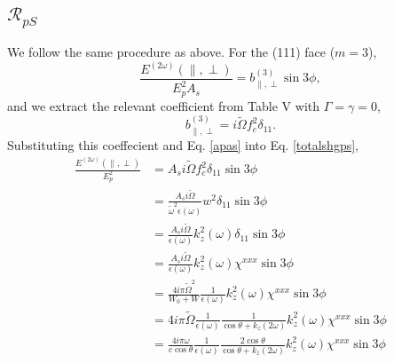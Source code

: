 \subsection{\texorpdfstring{$\mathcal{R}_{pS}$}{RpS}}
We follow the same procedure as above. For the (111) face ($m = 3$),
\begin{equation}\label{totalshgps}%
\frac{E^{(2\omega)}(\parallel,\perp)}{E^{2}_{p}A_{s}} 
= b^{(3)}_{\parallel,\perp}\sin3\phi,
\end{equation}
and we extract the relevant coefficient from Table V with $\Gamma=\gamma=0$,
\begin{equation*}
b^{(3)}_{\parallel,\perp} = i\tilde{\Omega}f^{2}_{c}\delta_{11}.
\end{equation*}
Substituting this coeffecient and Eq. \eqref{apas} into Eq. \eqref{totalshgps},
\begin{equation*}
\begin{split}
\frac{E^{(2\omega)}(\parallel,\perp)}{E^{2}_{p}}
&= A_{s}i\tilde{\Omega}f^{2}_{c}\delta_{11}\sin3\phi\\
&= \frac{A_{s}i\tilde{\Omega}}{\tilde{\omega}^{2}\epsilon(\omega)}
    w^{2}\delta_{11}\sin3\phi\\
&= \frac{A_{s}i\tilde{\Omega}}{\epsilon(\omega)}
    k^{2}_{z}(\omega)\delta_{11}\sin3\phi\\
&= \frac{A_{s}i\tilde{\Omega}}{\epsilon(\omega)}
    k^{2}_{z}(\omega)\chi^{xxx}\sin3\phi\\
&= \frac{4i\pi\tilde{\Omega}^{2}}{W_{0} + W}
   \frac{1}{\epsilon(\omega)}k^{2}_{z}(\omega)\chi^{xxx}\sin3\phi\\
&= 4i\pi\tilde{\Omega}\frac{1}{\epsilon(\omega)}
   \frac{1}{\cos\theta + k_{z}(2\omega)}k^{2}_{z}(\omega)\chi^{xxx}\sin3\phi\\
&= \frac{4i\pi\omega}{c\cos\theta}
   \frac{1}{\epsilon(\omega)}
   \frac{2\cos\theta}{\cos\theta + k_{z}(2\omega)}
   k^{2}_{z}(\omega)\chi^{xxx}\sin3\phi
\end{split}
\end{equation*}

